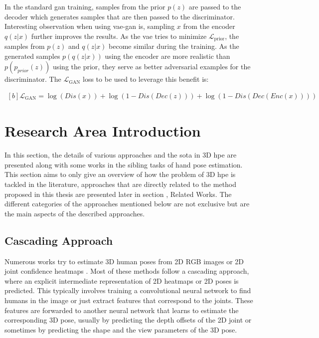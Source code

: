 In the standard \ac{gan} training, samples from the prior $p(z)$ are passed to the decoder which generates samples that are then passed to the discriminator. Interesting observation when using \ac{vae}-\ac{gan} is, sampling $x$ from the encoder $q(z|x)$ further improves the results. As the \ac{vae} tries to minimize $\mathcal{L}_{\text{prior}}$, the samples from $p(z)$ and $q(z|x)$ become similar during the training. As the generated samples $p(q(z|x))$ using the encoder are more realistic than $p(p_{prior}(z))$ using the prior, they serve as better adversarial examples for the discriminator. The $\mathcal{L}_{\mathrm{GAN}}$ loss to be used to leverage this benefit is: 


\begin{equation} \label{eqn:vaegan_ganloss}
    \begin{gathered}[b]
        \mathcal{L}_{\mathrm{GAN}}=\log (Dis(x))+\log (1-Dis(Dec(z)))+\log (1-Dis(Dec(Enc(x))))
    \end{gathered}
\end{equation}


\section{Research Area Introduction}
\label{sec:Research area introduction}

In this section, the details of various approaches and the \ac{sota} in 3D \ac{hpe} are presented along with some works in the sibling tasks of hand pose estimation. This section aims to only give an overview of how the problem of 3D \ac{hpe} is tackled in the literature, approaches that are directly related to the method proposed in this thesis are presented later in section , Related Works. The different categories of the approaches mentioned below are not exclusive but are the main aspects of the described approaches.

\subsection{Cascading Approach}

Numerous works try to estimate 3D human poses from 2D RGB images or 2D joint confidence heatmaps \cite{CameraDistanceAware, poselifter, DistillNRSfM, occlusionVideo, ordinalranking}. Most of these methods follow a cascading approach, where an explicit intermediate representation of 2D heatmaps or 2D poses is predicted. This typically involves training a convolutional neural network to find humans in the image or just extract features that correspond to the joints. These features are forwarded to another neural network that learns to estimate the corresponding 3D pose, usually by predicting the depth offsets of the 2D joint or sometimes by predicting the shape and the view parameters of the 3D pose.

